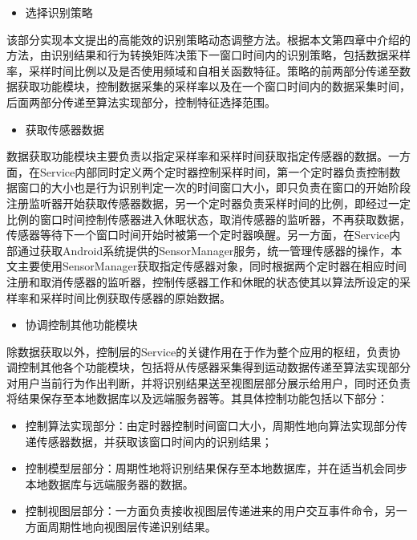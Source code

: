 \begin{itemize}
	\item 选择识别策略
\end{itemize}
\par 该部分实现本文提出的高能效的识别策略动态调整方法。根据本文第四章中介绍的方法，由识别结果和行为转换矩阵决策下一窗口时间内的识别策略，包括数据采样率，采样时间比例以及是否使用频域和自相关函数特征。策略的前两部分传递至数据获取功能模块，控制数据采集的采样率以及在一个窗口时间内的数据采集时间，后面两部分传递至算法实现部分，控制特征选择范围。
\begin{itemize}
	\item 获取传感器数据
\end{itemize}
\par 数据获取功能模块主要负责以指定采样率和采样时间获取指定传感器的数据。一方面，在Service内部同时定义两个定时器控制采样时间，第一个定时器负责控制数据窗口的大小也是行为识别判定一次的时间窗口大小，即只负责在窗口的开始阶段注册监听器开始获取传感器数据，另一个定时器负责采样时间的比例，即经过一定比例的窗口时间控制传感器进入休眠状态，取消传感器的监听器，不再获取数据，传感器等待下一个窗口时间开始时被第一个定时器唤醒。另一方面，在Service内部通过获取Android系统提供的SensorManager服务，统一管理传感器的操作，本文主要使用SensorManager获取指定传感器对象，同时根据两个定时器在相应时间注册和取消传感器的监听器，控制传感器工作和休眠的状态使其以算法所设定的采样率和采样时间比例获取传感器的原始数据。
\begin{itemize}
	\item 协调控制其他功能模块
\end{itemize}
\par 除数据获取以外，控制层的Service的关键作用在于作为整个应用的枢纽，负责协调控制其他各个功能模块，包括将从传感器采集得到运动数据传递至算法实现部分对用户当前行为作出判断，并将识别结果送至视图层部分展示给用户，同时还负责将结果保存至本地数据库以及远端服务器等。其具体控制功能包括以下部分：
\begin{itemize}
	\item 控制算法实现部分：由定时器控制时间窗口大小，周期性地向算法实现部分传递传感器数据，并获取该窗口时间内的识别结果；
	\item 控制模型层部分：周期性地将识别结果保存至本地数据库，并在适当机会同步本地数据库与远端服务器的数据。
	\item 控制视图层部分：一方面负责接收视图层传递进来的用户交互事件命令，另一方面周期性地向视图层传递识别结果。
\end{itemize}
